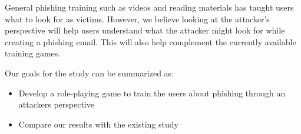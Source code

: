 General phishing training such as videos and reading materials has taught users what to look for as victims. However, we believe looking at the attacker's perspective will help users understand what the attacker might look for while creating a phishing email. This will also help complement the currently available training games.

Our goals for the study can be summarized as:

\begin{itemize}
    \setlength\itemsep{-0.6em}
    \item Develop a role-playing game to train the users about phishing through an attackers perspective
    \item Compare our results with the existing study
\end{itemize}
